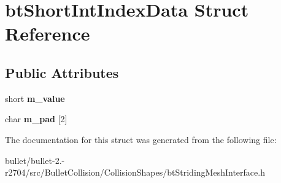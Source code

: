 \hypertarget{structbt_short_int_index_data}{\section{bt\+Short\+Int\+Index\+Data Struct Reference}
\label{structbt_short_int_index_data}
}
\subsection*{Public Attributes}
\begin{DoxyCompactItemize}
\item 
\hypertarget{structbt_short_int_index_data_aae4d06473d1b2056177fb30ee7709359}{short {\bfseries m\+\_\+value}}\label{structbt_short_int_index_data_aae4d06473d1b2056177fb30ee7709359}

\item 
\hypertarget{structbt_short_int_index_data_a31f277b2513454c1765c51e575321404}{char {\bfseries m\+\_\+pad} \mbox{[}2\mbox{]}}\label{structbt_short_int_index_data_a31f277b2513454c1765c51e575321404}

\end{DoxyCompactItemize}


The documentation for this struct was generated from the following file\+:\begin{DoxyCompactItemize}
\item 
bullet/bullet-\/2.-\/r2704/src/\+Bullet\+Collision/\+Collision\+Shapes/bt\+Striding\+Mesh\+Interface.\+h\end{DoxyCompactItemize}
